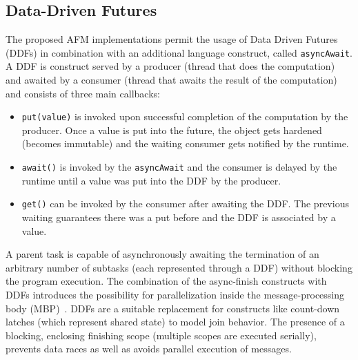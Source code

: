 \documentclass[11pt, journal]{IEEEtran}
\newcommand{\ct}{\lstinline[backgroundcolor=\color{white},basicstyle=\footnotesize\ttfamily]}
\begin{document}
\subsection{Data-Driven Futures}\label{subsec:ddf}
The proposed AFM implementations permit the usage of Data Driven Futures (DDFs) in combination with an additional language construct, called \ct{asyncAwait}. A DDF is construct served by a producer (thread that does the computation) and awaited by a consumer (thread that awaits the result of the computation) and consists of three main callbacks:
\begin{itemize}
	\item \ct{put(value)} is invoked upon successful completion of the computation by the producer. Once a value is put into the future, the object gets hardened (becomes immutable) and the waiting consumer gets notified by the runtime.
	\item \ct{await()} is invoked by the \ct{asyncAwait} and the consumer is delayed by the runtime until a value was put into the DDF by the producer.
	\item \ct{get()} can be invoked by the consumer after awaiting the DDF. The previous waiting guarantees there was a put before and the DDF is associated by a value.
\end{itemize}
A parent task is capable of asynchronously awaiting the termination of an arbitrary number of subtasks (each represented through a DDF) without blocking the program execution. The combination of the async-finish constructs with DDFs introduces the possibility for parallelization inside the message-processing body (MBP)~\cite{Imam:2012:ITP:2384616.2384671}. DDFs are a suitable replacement for constructs like count-down latches (which represent shared state) to model join behavior. The presence of a blocking, enclosing finishing scope (multiple scopes are executed serially), prevents data races as well as avoids parallel execution of messages.
\end{document}
